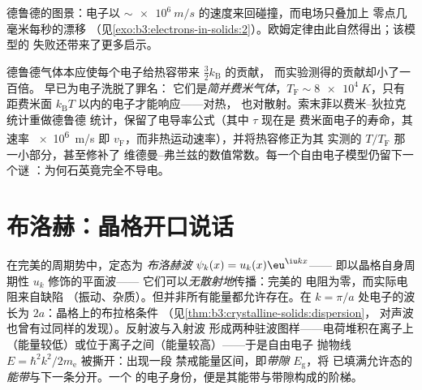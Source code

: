 \begin{omfigure}

{\small 德鲁德的图景：电子以
$\sim\qty{e6}{m/s}$ 的速度来回碰撞，而电场只叠加上
零点几毫米每秒的漂移
（见\cref{exo:b3:electrons-in-solids:2}）。欧姆定律由此自然得出；该模型的
失败还带来了更多启示。}
\end{omfigure}

\begin{remark}[索末菲的补救]\label{rem:b3:electrons-in-solids:sommerfeld}
德鲁德气体本应使每个电子给热容带来 $\tfrac32k_{\text{B}}$ 的贡献，
而实验测得的贡献却小了一百倍。
早已为电子洗脱了罪名：
它们是\emph{简并费米气体}，$T_{\text{F}} \sim
\qty{8e4}{K}$，只有距费米面
$k_{\text{B}}T$ 以内的电子才能响应——对热，
也对散射。索末菲以费米–狄拉克统计重做德鲁德
统计，保留了电导率公式（其中 $\tau$ 现在是
费米面电子的寿命，其速率 \qty{e6}{m/s} 即
$v_{\text{F}}$，而非热运动速率），并将热容修正为其
实测的 $T/T_{\text{F}}$ 那一小部分，甚至修补了
维德曼–弗兰兹的数值常数。每一个自由电子模型仍留下一个谜
：为何石英竟完全不导电。
\end{remark}

\section{布洛赫：晶格开口说话}

\begin{theorem}[布洛赫态与带隙]\label{thm:b3:electrons-in-solids:bloch}
在完美的周期势中，定态为
\emph{布洛赫波} $\psi_k(x) = u_k(x)\eu^{\iu kx}$——
即以晶格自身周期性 $u_k$ 修饰的平面波——
它们可以\emph{无散射地}传播：完美的
电阻为零，而实际电阻来自缺陷
（振动、杂质）。但并非所有能量都允许存在。在
$k = \pi/a$ 处电子的波长为 $2a$：晶格上的布拉格条件
（见\cref{thm:b3:crystalline-solids:dispersion}，
对声波也曾有过同样的发现）。反射波与入射波
形成两种驻波图样——电荷堆积在离子上
（能量较低）或位于离子之间（能量较高）——于是自由电子
抛物线 $E = \hbar^2k^2/2m_{\text{e}}$ 被撕开：出现一段
禁戒能量区间，即\emph{带隙} $E_{\text{g}}$，将
已填满允许态的\emph{能带}与下一条分开。一个
的电子身份，便是其能带与带隙构成的阶梯。
\end{theorem}
\admitted

